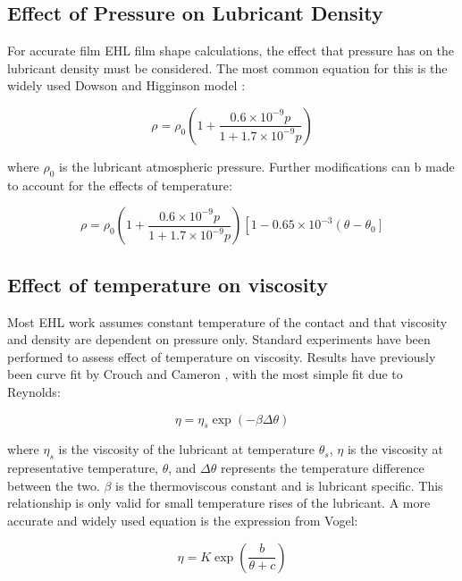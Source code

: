 \subsection{Effect of Pressure on Lubricant Density}

For accurate film EHL film shape calculations, the effect that pressure has on the lubricant density must be considered. The most common equation for this is the widely used Dowson and Higginson model \cite{Dowson1977}:

\begin{equation}\label{eq3.29}
	\rho=\rho_0\left(1+\frac{0.6 \times 10^{-9} p}{1+1.7 \times 10^{-9} p}\right)
\end{equation}

where $\rho_0$ is the lubricant atmospheric pressure. Further modifications can b made to account for the effects of temperature:

\begin{equation}\label{eq3.30}
	\rho=\rho_0\left(1+\frac{0.6 \times 10^{-9} p}{1+1.7 \times 10^{-9} p}\right)\left[1-0.65 \times 10^{-3}\left(\theta-\theta_0\right]\right.
\end{equation}


\subsection{Effect of temperature on viscosity}

Most EHL work assumes constant temperature of the contact and that viscosity and density are dependent on pressure only. Standard experiments have been performed to assess effect of temperature on viscosity. Results have previously been curve fit by Crouch and Cameron \cite{Crouch1961}, with the most simple fit due to Reynolds:

\begin{equation}\label{eq3.31}
	\eta=\eta_s \exp (-\beta \Delta \theta)
\end{equation}

where $\eta_s$ is the viscosity of the lubricant at temperature $\theta_s$, $\eta$ is the viscosity at representative temperature, $\theta$, and $\Delta \theta$ represents the temperature difference between the two. $\beta$ is the thermoviscous constant and is lubricant specific. This relationship is only valid for small temperature rises of the lubricant. A more accurate and widely used equation is the expression from Vogel:

\begin{equation}\label{eq3.32}
	\eta=K \exp \left(\frac{b}{\theta+c}\right)
\end{equation}

